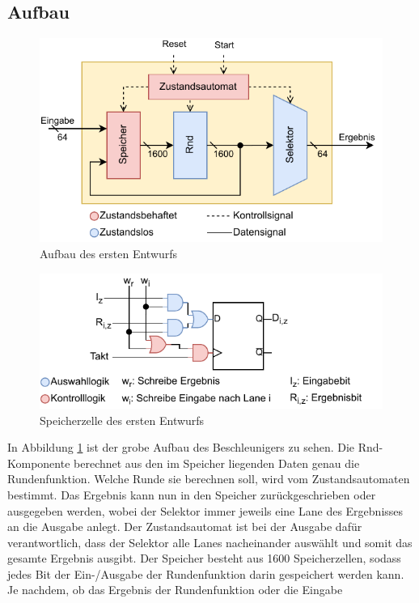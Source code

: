\subsection{Aufbau}
\begin{figure}
    \center
    \includegraphics{images/Iteration_1.pdf}
    \caption{Aufbau des ersten Entwurfs}
    \label{fig:aufbau_iteration_1}
\end{figure}
\begin{figure}
    \center
    \includegraphics{images/Iteration_1_Speicher.pdf}
    \caption{Speicherzelle des ersten Entwurfs}
    \label{fig:speicher_iteration_1}
\end{figure}
In Abbildung \ref{fig:aufbau_iteration_1} ist der grobe Aufbau des Beschleunigers zu sehen. Die Rnd-Komponente berechnet aus den im Speicher liegenden Daten genau die Rundenfunktion.
Welche Runde sie berechnen soll, wird vom Zustandsautomaten bestimmt. Das Ergebnis kann nun in den Speicher zurückgeschrieben oder ausgegeben werden,
wobei der Selektor immer jeweils eine Lane des Ergebnisses an die Ausgabe anlegt. Der Zustandsautomat ist bei der Ausgabe dafür verantwortlich,
dass der Selektor alle Lanes nacheinander auswählt und somit das gesamte Ergebnis ausgibt. Der Speicher besteht aus 1600 Speicherzellen,
sodass jedes Bit der Ein-/Ausgabe der Rundenfunktion darin gespeichert werden kann. Je nachdem, ob das Ergebnis der Rundenfunktion oder die Eingabe
